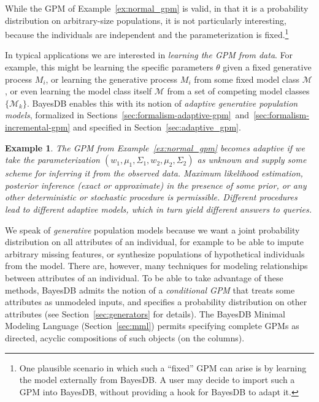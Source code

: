 \documentclass[10pt,letterpaper]{article}
\newtheorem{example}{Example}[section]
\newcommand{\set}[1]{\{#1\}}
\begin{document}
While the GPM of Example~\ref{ex:normal_gpm} is valid, in that it is a
probability distribution on arbitrary-size populations, it is not
particularly interesting, because the individuals are independent and
the parameterization is fixed.\footnote{One plausible scenario in
  which such a ``fixed'' GPM can arise is by learning the model
  externally from BayesDB.  A user may decide to import such a GPM
  into BayesDB, without providing a hook for BayesDB to adapt it.}

In typical applications we are interested in \textit{learning the GPM
  from data}. For example, this might be learning the specific
parameters $\theta$ given a fixed generative process $M_i$, or
learning the generative process $M_i$ from some fixed model class
$\mathcal{M}$, or even learning the model class itself $\mathcal{M}$
from a set of competing model classes $\set{\mathcal{M}_k}$.  BayesDB
enables this with its notion of \emph{adaptive generative population
  models}, formalized in
Sections~\ref{sec:formalism-adaptive-gpm}~and~\ref{sec:formalism-incremental-gpm}
and specified in Section~\ref{sec:adaptive_gpm}.

\begin{example}
The GPM from Example~\ref{ex:normal_gpm} becomes adaptive if we take
the parameterization $(w_1, \mu_1, \Sigma_1, w_2, \mu_2, \Sigma_2)$ as
unknown and supply some scheme for inferring it from the observed
data.  Maximum likelihood estimation, posterior inference (exact or
approximate) in the presence of some prior, or any other deterministic
or stochastic procedure is permissible.  Different procedures lead to
different adaptive models, which in turn yield different answers to
queries.
\end{example}

We speak of \emph{generative} population models because we want a
joint probability distribution on all attributes of an individual, for
example to be able to impute arbitrary missing features, or synthesize
populations of hypothetical individuals from the model.  There are,
however, many techniques for modeling relationships between attributes
of an individual.  To be able to take advantage of these methods,
BayesDB admits the notion of a \emph{conditional GPM} that treats some
attributes as unmodeled inputs, and specifies a probability
distribution on other attributes (see Section~\ref{sec:generators} for
details).  The BayesDB Minimal Modeling Language
(Section~\ref{sec:mml}) permits specifying complete GPMs as directed,
acyclic compositions of such objects (on the columns).
\end{document}
